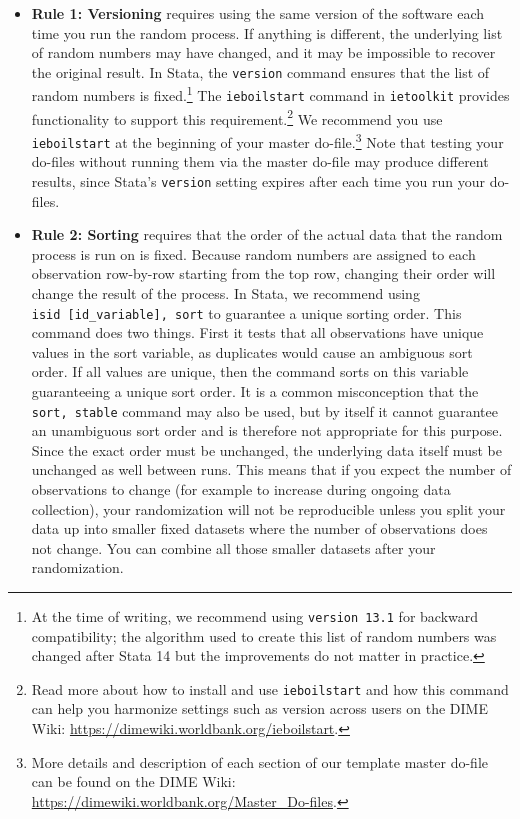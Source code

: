\documentclass[
]{book}
\providecommand{\tightlist}{%
  \setlength{\itemsep}{0pt}\setlength{\parskip}{0pt}}
\begin{document}
\begin{itemize}
\tightlist
\item
  \textbf{Rule 1: Versioning} requires using the same version of the software each time you run the random process.
  If anything is different, the underlying list of random numbers may have changed,
  and it may be impossible to recover the original result.
  In Stata, the \texttt{version} command ensures that the list of random numbers is fixed.\footnote{At the time of writing, we recommend using \texttt{version\ 13.1} for backward compatibility;
    the algorithm used to create this list of random numbers was changed after Stata 14 but the improvements do not matter in practice.}
  The \texttt{ieboilstart} command in \texttt{ietoolkit} provides functionality to support this requirement.\footnote{Read more about how to install and use \texttt{ieboilstart}
    and how this command can help you
    harmonize settings such as version across users on the DIME Wiki:
    \url{https://dimewiki.worldbank.org/ieboilstart}.}
  We recommend you use \texttt{ieboilstart} at the beginning of your master do-file.\footnote{More details and description of each section of our template master do-file
    can be found on the DIME Wiki:
    \url{https://dimewiki.worldbank.org/Master_Do-files}.}
  Note that testing your do-files without running them
  via the master do-file may produce different results,
  since Stata's \texttt{version} setting expires after each time you run your do-files.
\end{itemize}

\begin{itemize}
\tightlist
\item
  \textbf{Rule 2: Sorting} requires that the order of the actual data that the random process is run on is fixed.
  Because random numbers are assigned to each observation row-by-row starting from
  the top row,
  changing their order will change the result of the process.
  In Stata, we recommend using \texttt{isid\ {[}id\_variable{]},\ sort}
  to guarantee a unique sorting order.
  This command does two things.
  First it tests that all observations have unique values in the sort variable,
  as duplicates would cause an ambiguous sort order.
  If all values are unique,
  then the command sorts on this variable guaranteeing a unique sort order.
  It is a common misconception that the \texttt{sort,\ stable} command
  may also be used,
  but by itself it cannot guarantee an unambiguous sort order
  and is therefore not appropriate for this purpose.
  Since the exact order must be unchanged,
  the underlying data itself must be unchanged as well between runs.
  This means that if you expect the number of observations to change
  (for example to increase during ongoing data collection),
  your randomization will not be reproducible unless you split your data up into
  smaller fixed datasets where the number of observations does not change.
  You can combine all
  those smaller datasets after your randomization.
\end{itemize}
\end{document}
